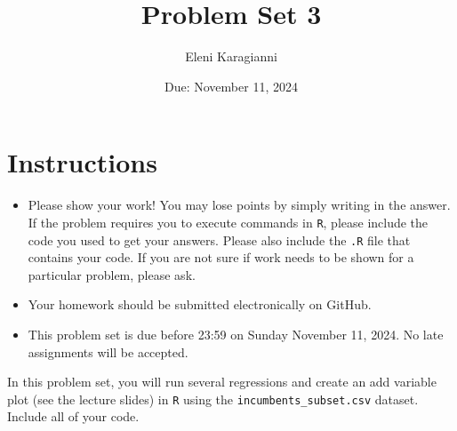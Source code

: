\documentclass[12pt,letterpaper]{article}
\title{Problem Set 3}
\date{Due: November 11, 2024}
\author{Eleni Karagianni}
\begin{document}
	\maketitle
	\section*{Instructions}
	\begin{itemize}
		\item Please show your work! You may lose points by simply writing in the answer. If the problem requires you to execute commands in \texttt{R}, please include the code you used to get your answers. Please also include the \texttt{.R} file that contains your code. If you are not sure if work needs to be shown for a particular problem, please ask.
	\item Your homework should be submitted electronically on GitHub.
	\item This problem set is due before 23:59 on Sunday November 11, 2024. No late assignments will be accepted.

	\end{itemize}

		\vspace{.25cm}
	
\noindent In this problem set, you will run several regressions and create an add variable plot (see the lecture slides) in \texttt{R} using the \texttt{incumbents\_subset.csv} dataset. Include all of your code.

	\vspace{.5cm}
\end{document}
